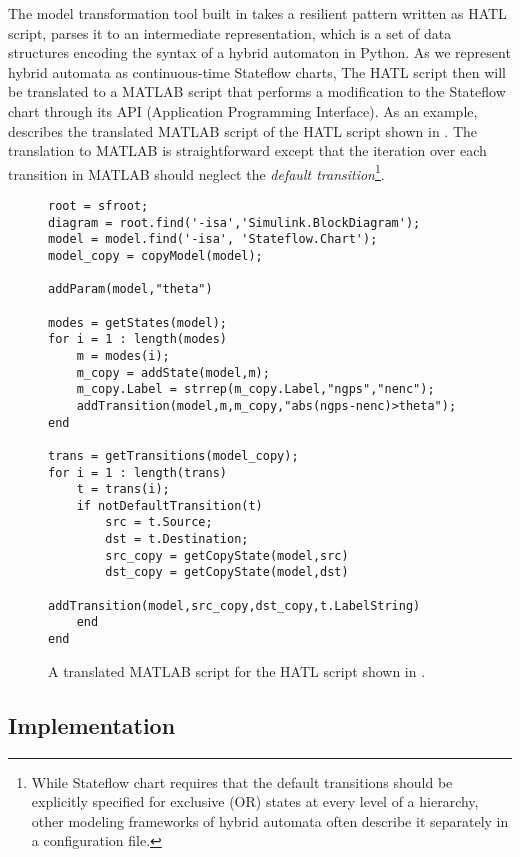 The model transformation tool built in \toolreaffirm takes a resilient pattern written as HATL script, parses it to an intermediate representation, which is a set of data structures encoding the syntax of a hybrid automaton in Python. As we represent hybrid automata as continuous-time Stateflow charts,
%
The HATL script then will be translated to a MATLAB script that performs a modification to the Stateflow chart through its API (Application Programming Interface). As an example,  describes the translated MATLAB script of the HATL script shown in . The translation to MATLAB is straightforward except that the iteration over each transition in MATLAB should neglect the \emph{default transition}\footnote{While Stateflow chart requires that the default transitions should be explicitly specified for exclusive (OR) states at every level of a hierarchy, other modeling frameworks of hybrid automata often describe it separately in a configuration file.}.  
%
\begin{figure}[!t]%
\begin{lstlisting}[basicstyle=\ttfamily\footnotesize, numbers=none]
root = sfroot;
diagram = root.find('-isa','Simulink.BlockDiagram');
model = model.find('-isa', 'Stateflow.Chart');
model_copy = copyModel(model);

addParam(model,"theta")

modes = getStates(model);
for i = 1 : length(modes)
	m = modes(i);
	m_copy = addState(model,m);
	m_copy.Label = strrep(m_copy.Label,"ngps","nenc");
	addTransition(model,m,m_copy,"abs(ngps-nenc)>theta");
end

trans = getTransitions(model_copy);
for i = 1 : length(trans)
	t = trans(i);
	if notDefaultTransition(t)
		src = t.Source;
		dst = t.Destination;
		src_copy = getCopyState(model,src)
		dst_copy = getCopyState(model,dst)
		addTransition(model,src_copy,dst_copy,t.LabelString)
	end
end
\end{lstlisting}
\caption{A translated MATLAB script for the HATL script shown in .}%
%
\end{figure}
%
\subsection{Implementation}